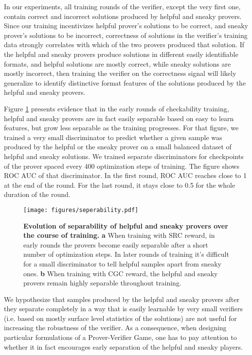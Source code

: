 \documentclass{article}
\begin{document}
In our experiments, all training rounds of the verifier, except the very first one, contain correct and incorrect solutions produced by helpful and sneaky provers. Since our training incentivizes helpful prover's solutions to be correct, and sneaky prover's solutions to be incorrect, correctness of solutions in the verifier's training data strongly correlates with which of the two provers produced that solution. If the helpful and sneaky provers produce solutions in different easily identifiable formats, and helpful solutions are mostly correct, while sneaky solutions are mostly incorrect, then training the verifier on the correctness signal will likely generalize to identify distinctive format features of the solutions produced by the helpful and sneaky provers.

Figure \ref{fig:separability} presents evidence that in the early rounds of checkability training, helpful and sneaky provers are in fact easily separable based on easy to learn features, but grow less separable as the training progresses. For that figure, we trained a very small discriminator to predict whether a given sample was produced by the helpful or the sneaky prover on a small balanced dataset of helpful and sneaky solutions. We trained separate discriminators for checkpoints of the prover spaced every 400 optimization steps of training. The figure shows ROC AUC of that discriminator. In the first round, ROC AUC reaches close to 1 at the end of the round. For the last round, it stays close to 0.5 for the whole duration of the round.

\begin{figure}[h]
    \centering
    \texttt{[image: figures/seperability.pdf]}
    \caption{\textbf{Evolution of separability of helpful and sneaky provers over the course of training.} \textbf{a} When training with SRC reward, in early rounds the provers become easily separable after a short number of optimization steps. In later rounds of training it's difficult for a small discriminator to tell helpful samples apart from sneaky ones. \textbf{b} When training with CGC reward, the helpful and sneaky provers remain highly separable throughout training.}
    \label{fig:separability}
\end{figure}

We hypothesize that samples produced by the helpful and sneaky provers after they separate completely in a way that is easily learnable by very small verifiers (i.e. based on mostly surface level statistics of the solutions) are not useful for increasing the robustness of the verifier. As a consequence, when designing particular formulations of a Prover-Verifier Game, one has to pay attention to whether it in fact encourages early separation of the helpful and sneaky players.
\end{document}
